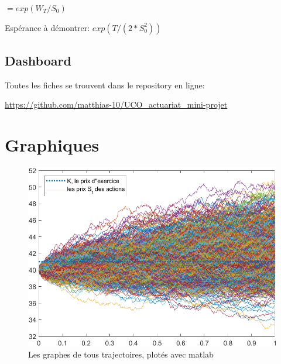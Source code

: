 \documentclass[a4paper,12pt]{scrartcl}
\begin{document}
$=exp(W_T/S_0)$

Espérance à démontrer:
$exp(T/(2*S_0^2))$


\subsection{Dashboard}








\clearpage

\appendix
\appendixpage
\addappheadtotoc

\begin{center}
Toutes les fiches se trouvent dans le repository en ligne: 

 \url{https://github.com/matthias-10/UCO_actuariat_mini-projet}
\end{center}

\section{Graphiques} \label{graphiques}

\begin{figure}[h!]
  \begin{center}
    \includegraphics[width=14cm]{"graphiques/S.png"}
    \caption{Les graphes de tous trajectoires, plotés avec matlab}
    \label{fig:S}
  \end{center}
\end{figure}
\end{document}
